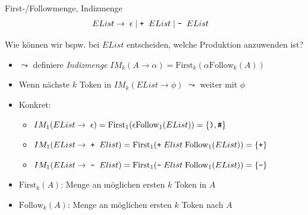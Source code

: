 \documentclass{beamer}
\begin{document}
\begin{frame}{First-/Followmenge, Indizmenge}
	\begin{align*}
		EList \to & \;\; \epsilon \mid \textrm{\texttt{+}} \;\; EList \mid \textrm{\texttt{-}} \;\; EList
	\end{align*}
	
	Wie können wir bspw. bei $EList$ entscheiden, welche Produktion anzuwenden ist?
	\pause
	\begin{itemize}
		\item $\leadsto$ definiere \emph{Indizmenge} $IM_k(A \to \alpha) = \textrm{First}_k(\alpha \textrm{Follow}_k(A))$
		\item Wenn nächste $k$ Token in $IM_k(EList \to \phi)$ $\leadsto$ weiter mit $\phi$
		\item Konkret:
		\begin{itemize}
			\item $IM_1(EList \to \; \epsilon) = \textrm{First}_1(\epsilon \textrm{Follow}_1(EList)) = \{ \textrm{\texttt{)}}, \textrm{\texttt{\#}} \}$
			\item $IM_1(EList \to \; \textrm{\texttt{+}} \;\; Elist) = \textrm{First}_1(\textrm{\texttt{+}} \; Elist \; \textrm{Follow}_1(EList)) = \{ \textrm{\texttt{+}} \}$
			\item $IM_1(EList \to \; \textrm{\texttt{-}} \;\; Elist) = \textrm{First}_1(\textrm{\texttt{-}} \; Elist \; \textrm{Follow}_1(EList)) = \{ \textrm{\texttt{-}} \}$
		\end{itemize}
		\pause
		\item $\textrm{First}_k(A)$: Menge an möglichen ersten $k$ Token in $A$
		\item $\textrm{Follow}_k(A)$: Menge an möglichen ersten $k$ Token nach $A$
	\end{itemize}
\end{frame}
\end{document}
